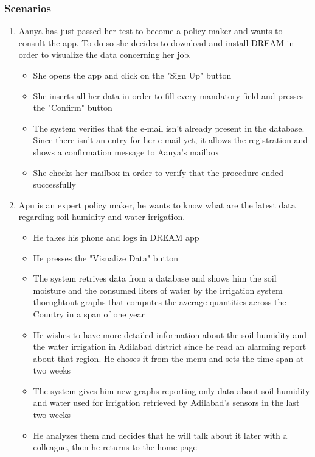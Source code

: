 \documentclass[table, 12pt]{article}
\begin{document}
\subsubsection{Scenarios}
\label{scenarios}
\begin{enumerate}

    \item Aanya has just passed her test to become a policy maker and wants to consult the app.
    To do so she decides to download and install DREAM in order to visualize the data concerning her job.
    \begin{itemize}
        \item She opens the app and click on the "Sign Up" button
        \item She inserts all her data in order to fill every mandatory field and presses the "Confirm" button
        \item The system verifies that the e-mail isn't already present in the database. Since there isn't an entry for her e-mail yet, it allows the registration and shows a confirmation message to Aanya's mailbox
        \item She checks her mailbox in order to verify that the procedure ended successfully
    \end{itemize}

    \item Apu is an expert policy maker, he wants to know what are the latest data regarding soil humidity and water irrigation.
    \begin{itemize}
        \item He takes his phone and logs in DREAM app 
        \item He presses the "Visualize Data" button
        \item The system retrives data from a database and shows him the soil moisture and the consumed liters of water by the irrigation system thorughtout graphs that computes the average quantities across the Country in a span of one year
        \item He wishes to have more detailed information about the soil humidity and the water irrigation in Adilabad district since he read an alarming report about that region.
        He choses it from the menu and sets the time span at two weeks
        \item The system gives him new graphs reporting only data about soil humidity and water used for irrigation retrieved by Adilabad's sensors in the last two weeks
        \item He analyzes them and decides that he will talk about it later with a colleague, then he returns to the home page
    \end{itemize} 


\end{enumerate}
\end{document}
